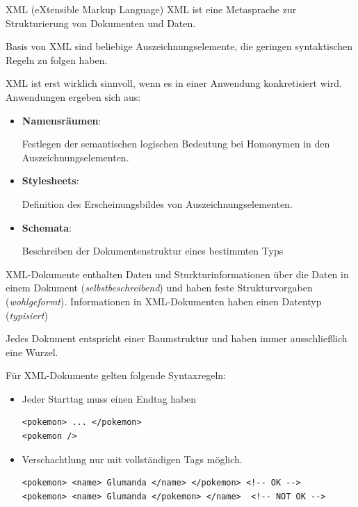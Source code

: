 \begin{defi}{XML (eXtensible Markup Language)}
    XML ist eine Metasprache zur Strukturierung von Dokumenten und Daten.

    Basis von XML sind beliebige Auszeichnungselemente, die geringen syntaktischen Regeln zu folgen haben.

    XML ist erst wirklich sinnvoll, wenn es in einer Anwendung konkretisiert wird.
    Anwendungen ergeben sich aus:

    \begin{itemize}
        \item \textbf{Namensräumen}:

              Festlegen der semantischen logischen Bedeutung bei Homonymen in den Auszeichnungselementen.
        \item \textbf{Stylesheets}:

              Definition des Erscheinungsbildes von Auszeichnungselementen.
        \item \textbf{Schemata}:

              Beschreiben der Dokumentenstruktur eines bestimmten Typs
    \end{itemize}

    XML-Dokumente enthalten Daten und Sturkturinformationen über die Daten in einem Dokument (\emph{selbstbeschreibend}) und haben feste Strukturvorgaben (\emph{wohlgeformt}).
    Informationen in XML-Dokumenten haben einen Datentyp (\emph{typisiert})

    Jedes Dokument entspricht einer Baumstruktur und haben immer ausschließlich eine Wurzel.

    Für XML-Dokumente gelten folgende Syntaxregeln:

    \begin{itemize}
        \item Jeder Starttag muss einen Endtag haben

              \begin{lstlisting}
<pokemon> ... </pokemon>
<pokemon />
\end{lstlisting}
        \item Verschachtlung nur mit vollständigen Tags möglich.

              \begin{lstlisting}
<pokemon> <name> Glumanda </name> </pokemon> <!-- OK -->
<pokemon> <name> Glumanda </pokemon> </name>  <!-- NOT OK -->
\end{lstlisting}
    \end{itemize}
\end{defi}

